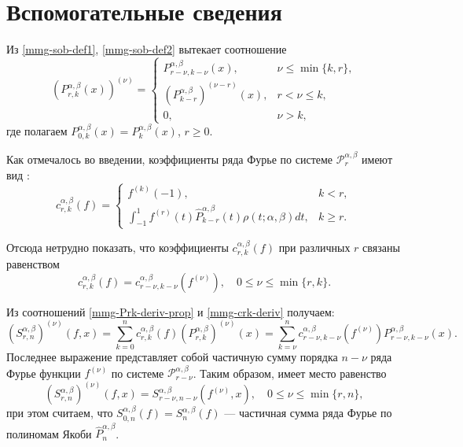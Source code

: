 \section{Вспомогательные сведения}
Из \eqref{mmg-sob-def1}, \eqref{mmg-sob-def2} вытекает соотношение
\begin{equation}\label{mmg-Prk-deriv-prop}
	(P^{\alpha,\beta}_{r,k}(x))^{(\nu)} =
	\begin{cases}
		P^{\alpha,\beta}_{r-\nu,k-\nu}(x), &\nu \le \min\{k,r\},\\
		(P^{\alpha,\beta}_{k-r})^{(\nu-r)}(x), &r < \nu \le k,\\
		0, &\nu > k,
	\end{cases}
\end{equation}
где полагаем $P^{\alpha,\beta}_{0,k}(x)=P^{\alpha,\beta}_{k}(x)$, $r \ge 0$.

Как отмечалось во введении, коэффициенты ряда Фурье по системе $\mathcal{P}^{\alpha,\beta}_r$ имеют вид \cite[с. 10]{mmg-SharapudinovIzvRan2019}:
\begin{equation}\label{mmg-crk}
	c^{\alpha,\beta}_{r,k}(f)=
	\begin{cases}
		f^{(k)}(-1), &k < r,\\
		\int_{-1}^1 f^{(r)}(t)\hat{P}_{k-r}^{\alpha,\beta}(t)\rho(t;\alpha,\beta)dt, &k \ge r.
	\end{cases}
\end{equation}

Отсюда нетрудно показать, что коэффициенты $c^{\alpha,\beta}_{r,k}(f)$ при различных $r$ связаны равенством
\begin{equation}\label{mmg-crk-deriv}
	c^{\alpha,\beta}_{r,k}(f)=c^{\alpha,\beta}_{r-\nu,k-\nu}(f^{(\nu)}), \quad 0 \le \nu \le \min\{r,k\}.
\end{equation}

Из соотношений \eqref{mmg-Prk-deriv-prop} и \eqref{mmg-crk-deriv} получаем:
\begin{equation*}
	(S^{\alpha,\beta}_{r,n})^{(\nu)}(f,x)=
	\sum_{k=0}^{n}c^{\alpha,\beta}_{r,k}(f)(P^{\alpha,\beta}_{r,k})^{(\nu)}(x)=
	\sum_{k=\nu}^{n}c^{\alpha,\beta}_{r-\nu,k-\nu}(f^{(\nu)})P^{\alpha,\beta}_{r-\nu,k-\nu}(x).
\end{equation*}
Последнее выражение представляет собой частичную сумму порядка $n-\nu$ ряда Фурье функции $f^{(\nu)}$ по системе $\mathcal{P}^{\alpha,\beta}_{r-\nu}$. Таким образом, имеет место равенство
\begin{equation}\label{mmg-Srn-deriv}
	(S^{\alpha,\beta}_{r,n})^{(\nu)}(f,x)=
	S^{\alpha,\beta}_{r-\nu,n-\nu}(f^{(\nu)},x), \quad 0 \le \nu \le \min\{r,n\},
\end{equation}
при этом считаем, что $S^{\alpha,\beta}_{0,n}(f)=S^{\alpha,\beta}_n(f)$ --- частичная сумма ряда Фурье по полиномам Якоби $\hat{P}^{\alpha,\beta}_n$.

